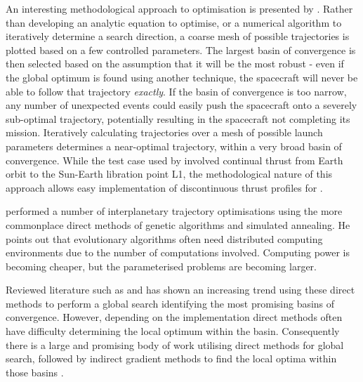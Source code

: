 An interesting methodological approach to optimisation is presented by \textcite{Jackson2008}. Rather than developing an analytic equation to optimise, or a numerical algorithm to iteratively determine a search direction, a coarse mesh of possible trajectories is plotted based on a few controlled parameters. The largest basin of convergence is then selected based on the assumption that it will be the most robust - even if the global optimum is found using another technique, the spacecraft will never be able to follow that trajectory \emph{exactly}. If the basin of convergence is too narrow, any number of unexpected events could easily push the spacecraft onto a severely sub-optimal trajectory, potentially resulting in the spacecraft not completing its mission. Iteratively calculating trajectories over a mesh of possible launch parameters determines a near-optimal trajectory, within a very broad basin of convergence. While the test case used by \textcite{Jackson2008} involved continual thrust from Earth orbit to the Sun-Earth libration point L1, the methodological nature of this approach allows easy implementation of discontinuous thrust profiles for \BW.%

\textcite{Lee2005} performed a number of interplanetary trajectory optimisations using the more commonplace direct methods of genetic algorithms and simulated annealing. He points out that evolutionary algorithms often need distributed computing environments due to the number of computations involved. Computing power is becoming cheaper, but the parameterised problems are becoming larger. 

Reviewed literature such as \textcite{Dachwald2005} and \textcite{Jackson2008} has shown an increasing trend using these direct methods to perform a global search identifying the most promising basins of convergence. However, depending on the implementation direct methods often have difficulty determining the local optimum within the basin. 
Consequently there is a large and promising body of work utilising direct methods for global search, followed by indirect gradient methods to find the local optima within those basins \parencite{Stryck1992, Kluever1995, Vasile2009, Yam2011}.


